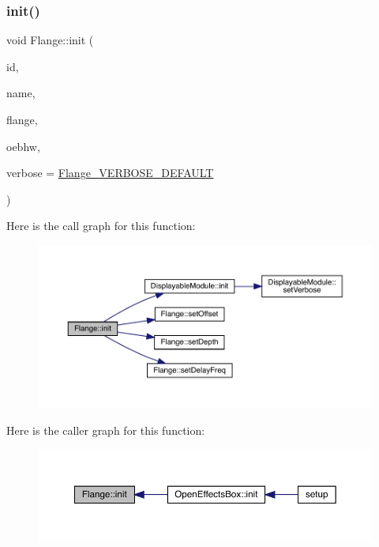 \subsubsection{\texorpdfstring{init()}{init()}}
{\footnotesize\ttfamily void Flange\+::init (\begin{DoxyParamCaption}\item[{int}]{id,  }\item[{char $\ast$}]{name,  }\item[{Audio\+Effect\+Flange $\ast$}]{flange,  }\item[{\mbox{\hyperlink{class_open_effects_box_h_w}{Open\+Effects\+Box\+HW}} $\ast$}]{oebhw,  }\item[{int}]{verbose = {\ttfamily \mbox{\hyperlink{_flange_8h_abe629c5baa4633f9806318a67d486437}{Flange\+\_\+\+V\+E\+R\+B\+O\+S\+E\+\_\+\+D\+E\+F\+A\+U\+LT}}} }\end{DoxyParamCaption})}

Here is the call graph for this function\+:\nopagebreak
\begin{figure}[H]
\begin{center}
\leavevmode
\includegraphics[width=350pt]{class_flange_a0b08351febfa39989acb6446c096346e_cgraph}
\end{center}
\end{figure}
Here is the caller graph for this function\+:\nopagebreak
\begin{figure}[H]
\begin{center}
\leavevmode
\includegraphics[width=350pt]{class_flange_a0b08351febfa39989acb6446c096346e_icgraph}
\end{center}
\end{figure}
\mbox{\label{class_flange_a10541758c108d92a73e96ed9f8f1377b}} 
